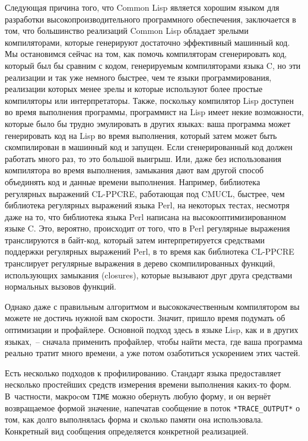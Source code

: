 Следующая причина того, что Common Lisp является хорошим языком для разработки
высокопроизводительного программного обеспечения, заключается в том, что большинство
реализаций Common Lisp обладает зрелыми компиляторами, которые генерируют достаточно
эффективный машинный код. Мы остановимся сейчас на том, как помочь компиляторам
сгенерировать код, который был бы сравним с кодом, генерируемым компиляторами языка C, но
эти реализации и так уже немного быстрее, чем те языки программирования, реализации
которых менее зрелы и которые используют более простые компиляторы или
интерпретаторы. Также, поскольку компилятор Lisp доступен во время выполнения программы,
программист на Lisp имеет некие возможности, которые было бы трудно эмулировать в других
языках: ваша программа может генерировать код на Lisp во время выполнения, который затем
может быть скомпилирован в машинный код и запущен. Если сгенерированный код должен
работать много раз, то это большой выигрыш. Или, даже без использования компилятора во
время выполнения, замыкания дают вам другой способ объединять код и данные времени
выполнения. Например, библиотека регулярных выражений CL-PPCRE, работающая под CMUCL,
быстрее, чем библиотека регулярных выражений языка Perl, на некоторых тестах, несмотря
даже на то, что библиотека языка Perl написана на высокооптимизированном языке C. Это,
вероятно, происходит от того, что в Perl регулярные выражения транслируются в байт-код,
который затем интерпретируется средствами поддержки регулярных выражений Perl, в то время
как библиотека CL-PPCRE транслирует регулярные выражения в дерево скомпилированных
функций, использующих замыкания (closures), которые вызывают друг друга средствами
нормальных вызовов функций.

Однако даже с правильным алгоритмом и высококачественным компилятором вы можете не
достичь нужной вам скорости. Значит, пришло время подумать об оптимизации и
профайлере. Основной подход здесь в языке Lisp, как и в других языках,~-- сначала
применить профайлер, чтобы найти места, где ваша программа реально тратит много времени, а
уже потом озаботиться ускорением этих частей.

Есть несколько подходов к профилированию. Стандарт языка предоставляет несколько
простейших средств измерения времени выполнения каких-то форм. В~частности, макроcом
\lstinline{TIME} можно обернуть любую форму, и он вернёт возвращаемое формой значение,
напечатав сообщение в поток \lstinline!*TRACE_OUTPUT*! о том, как долго выполнялась форма
и сколько памяти она использовала. Конкретный вид сообщения определяется конкретной
реализацией.

